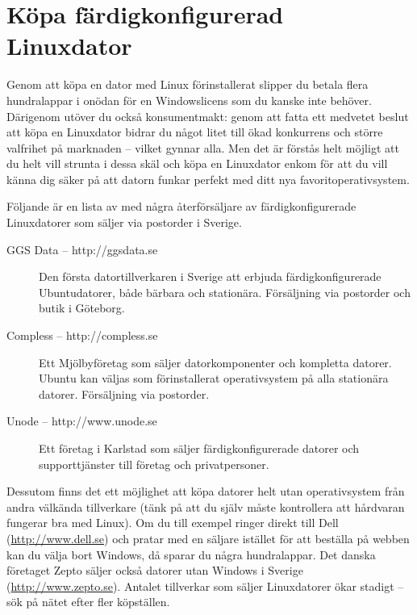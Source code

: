 \documentclass[a4paper,final]{memoir} %
\begin{document}
\section{Köpa färdigkonfigurerad Linuxdator}\label{sec:datorhandlare}

Genom att köpa en dator med Linux förinstallerat slipper du betala flera hundralappar i onödan för en Windowslicens som du kanske inte behöver. Därigenom utöver du också konsumentmakt: genom att fatta ett medvetet beslut att köpa en Linuxdator bidrar du något litet till ökad konkurrens och större valfrihet på marknaden -- vilket gynnar alla. Men det är förstås helt möjligt att du helt vill strunta i dessa skäl och köpa en Linuxdator enkom för att du vill känna dig säker på att datorn funkar perfekt med ditt nya favoritoperativsystem.

Följande är en lista av med några återförsäljare av färdigkonfigurerade Linuxdatorer som säljer via postorder i Sverige. 

\begin{description}

\item[GGS Data -- http://ggsdata.se] Den första datortillverkaren i Sverige att erbjuda färdigkonfigurerade Ubuntudatorer, både bärbara och stationära. Försäljning via postorder och butik i Göteborg.

\item[Compless -- http://compless.se] Ett Mjölbyföretag som säljer datorkomponenter och kompletta datorer. Ubuntu kan väljas som förinstallerat operativsystem på alla stationära datorer. Försäljning via postorder.

\item[Unode -- http://www.unode.se] Ett företag i Karlstad som säljer färdigkonfigurerade datorer och supporttjänster till företag och privatpersoner. 

\end{description}

Dessutom finns det ett möjlighet att köpa datorer helt utan operativsystem från andra välkända tillverkare (tänk på att du själv måste kontrollera att hårdvaran fungerar bra med Linux). Om du till exempel ringer direkt till Dell (\url{http://www.dell.se}) och pratar med en säljare istället för att beställa på webben kan du välja bort Windows, då sparar du några hundralappar. Det danska företaget Zepto säljer också datorer utan Windows  i Sverige (\url{http://www.zepto.se}). Antalet tillverkar som säljer Linuxdatorer ökar stadigt -- sök på nätet efter fler köpställen.
\end{document}
